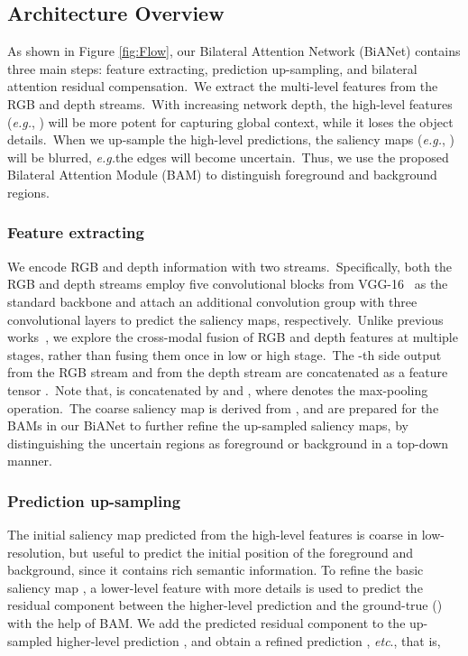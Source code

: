 \documentclass[journal]{IEEEtran}
\def\eg{\emph{e.g.}}
\def\etc{\emph{etc}}
\newcommand{\figref}[1]{Figure \ref{#1}}
\begin{document}
\subsection{Architecture Overview}
As shown in \figref{fig:Flow}, our Bilateral Attention Network (BiANet) contains three main steps: feature extracting, prediction up-sampling, and bilateral attention residual compensation.\
We extract the multi-level features from the RGB and depth streams.\
With increasing network depth, the high-level features (\eg, ) will be more potent for capturing global context,
while it loses the object details.\
When we up-sample the high-level predictions, the saliency maps (\eg, ) will be blurred, \eg the edges will become uncertain.\
Thus, we use the proposed Bilateral Attention Module (BAM) to distinguish foreground and background regions.\


\subsubsection{Feature extracting}
We encode RGB and depth information with two streams.\
Specifically, both the RGB and depth streams employ five convolutional blocks from VGG-16~\cite{simonyan2015vgg} as the standard backbone
and attach an additional convolution group with three convolutional layers to predict the saliency maps, respectively.\
Unlike previous works~\cite{han2017cnns,zhu2019pdnet,chen2019multi},
we explore the cross-modal fusion of RGB and depth features at multiple stages, rather than fusing them once in low or high stage.\
The -th side output  from the RGB stream and  from the depth stream are concatenated as a feature tensor .\
Note that,  is concatenated by  and , where  denotes the max-pooling operation.\
The coarse saliency map  is derived from , 
and  are prepared for the BAMs in our BiANet to further refine the up-sampled saliency maps, by distinguishing the uncertain regions as foreground or background in a top-down manner.


\subsubsection{Prediction up-sampling}
The initial saliency map predicted from the high-level features is coarse in low-resolution, but useful to predict the initial position of the foreground and background, since it contains rich semantic information.
To refine the basic saliency map , a lower-level feature  with more details is used to predict the residual component between the higher-level prediction and the ground-true () with the help of BAM.
We add the predicted residual component  to the up-sampled higher-level prediction , and obtain a refined prediction , \etc., that is,
\end{document}
